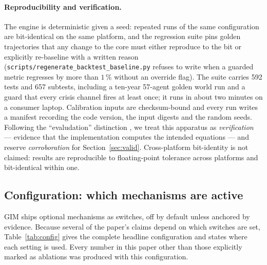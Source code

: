 \documentclass[12pt,a4paper]{article}
\newcommand{\nTests}{592} \newcommand{\nSubtests}{657}
\begin{document}
\paragraph{Reproducibility and verification.} The engine is deterministic given a seed:
repeated runs of the same configuration are bit-identical on the same platform, and the
regression suite pins golden trajectories that any change to the core must either reproduce to
the bit or explicitly re-baseline with a written reason
(\texttt{scripts/regenerate\_backtest\_baseline.py} refuses to write when a guarded metric
regresses by more than $1\,\%$ without an override flag). The suite carries \nTests{} tests
and \nSubtests{} subtests, including a ten-year 57-agent golden world run and a guard that
every crisis channel fires at least once; it runs in about two minutes on a consumer laptop.
Calibration inputs are checksum-bound and every run writes a manifest recording the code
version, the input digests and the random seeds. Following the ``evaludation'' distinction
\citep{augusiak2014}, we treat this apparatus as \emph{verification} --- evidence that the
implementation computes the intended equations --- and reserve \emph{corroboration} for
Section~\ref{sec:valid}. Cross-platform bit-identity is not claimed: results are reproducible
to floating-point tolerance across platforms and bit-identical within one.

\subsection{Configuration: which mechanisms are active}
\label{sec:arch:config}

GIM ships optional mechanisms as switches, off by default unless anchored by evidence. Because
several of the paper's claims depend on which switches are set, Table~\ref{tab:config} gives
the complete headline configuration and states where each setting is used. Every number in
this paper other than those explicitly marked as ablations was produced with this
configuration.
\end{document}
